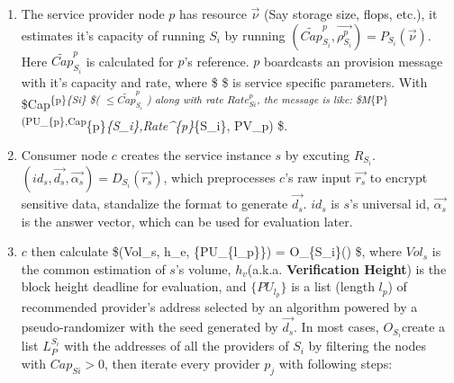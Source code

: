 \documentclass[11pt]{article}
\def\gt{>}
\begin{document}
\begin{enumerate}
\def\labelenumi{\arabic{enumi}.}
\item
  The service provider node \(p\) has resource \(\vec{\nu}\) (Say
  storage size, flops, etc.), it estimates it's capacity of running
  \(S_i\) by running
  \((\tilde{Cap}^{p}_{S_i}, \vec{\rho_{S_i}^p} ) = P_{S_i}(\vec{\nu})\).
  Here \(\tilde{Cap}^{p}_{S_i}\) is calculated for \(p\)'s reference.
  \(p\) boardcasts an provision message with it's capacity and rate,
  where \$ \$ is service specific parameters. With
  \$Cap\textsuperscript{\{p\}\emph{\{Si\} \$(
  \(\le\tilde{Cap}^{p}_{S_i}\) ) along with rate \(Rate^{p}_{Si}\), the
  message is like:
  \$M}\{P\}(PU\_\{p\},Cap}\{p\}\emph{\{S\_i\},Rate\^{}\{p\}}\{S\_i\},
   \textbar{} PV\_p) \$.
\item
  Consumer node \(c\) creates the service instance \(s\) by excuting
  \(R_{S_i}\). \((id_s,\vec{d_s},\vec{\alpha_s})=D_{S_i}(\vec{r_s})\),
  which preprocesses \(c\)'s raw input \(\vec{r_s}\) to encrypt
  sensitive data, standalize the format to generate \(\vec{d_s}\).
  \(id_s\) is \(s\)'s universal id, \(\vec{\alpha_s}\) is the answer
  vector, which can be used for evaluation later.
\item
  \(c\) then calculate \$(Vol\_s, h\_e, \{PU\_\{l\_p\}\}) =
  O\_\{S\_i\}() \$, where \(Vol_s\) is the common estimation of
  \(s\)'s volume, \(h_v\)(a.k.a. \textbf{Verification Height}) is the
  block height deadline for evaluation, and \(\{PU_{l_p}\}\) is a list
  (length \(l_p\)) of recommended provider's address selected by an
  algorithm powered by a pseudo-randomizer with the seed generated by
  \(\vec{d_s}\). In most cases, \(O_{S_i}\)create a list \(L_{P}^{S_i}\)
  with the addresses of all the providers of \(S_i\) by filtering the
  nodes with \(Cap_{Si} \gt 0\), then iterate every provider \(p_j\)
  with following steps:
\end{enumerate}
\end{document}
